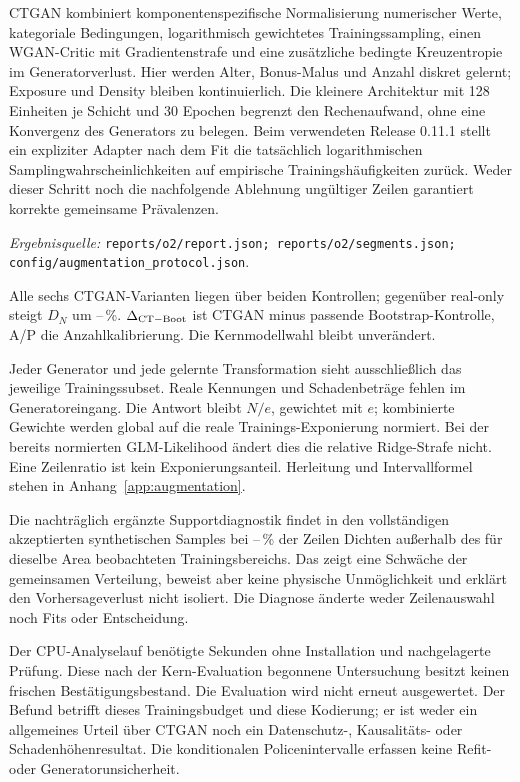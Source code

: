 \documentclass[11pt,a4paper]{article}
\newcommand{\evidence}[1]{\par{\footnotesize\textit{Ergebnisquelle:} \nolinkurl{#1}.}\par}
\begin{document}
CTGAN \cite{ctgan} kombiniert komponentenspezifische Normalisierung numerischer Werte, kategoriale Bedingungen, logarithmisch gewichtetes Trainingssampling, einen WGAN-Critic mit Gradientenstrafe und eine zusätzliche bedingte Kreuzentropie im Generatorverlust. Hier werden Alter, Bonus-Malus und Anzahl diskret gelernt; Exposure und Density bleiben kontinuierlich. Die kleinere Architektur mit 128 Einheiten je Schicht und 30 Epochen begrenzt den Rechenaufwand, ohne eine Konvergenz des Generators zu belegen. Beim verwendeten Release 0.11.1 stellt ein expliziter Adapter nach dem Fit die tatsächlich logarithmischen Samplingwahrscheinlichkeiten auf empirische Trainingshäufigkeiten zurück. Weder dieser Schritt noch die nachfolgende Ablehnung ungültiger Zeilen garantiert korrekte gemeinsame Prävalenzen.

\begin{center}\AugmentationTable\end{center}
\evidence{reports/o2/report.json; reports/o2/segments.json; config/augmentation_protocol.json}
Alle sechs CTGAN-Varianten liegen über beiden Kontrollen; gegenüber real-only steigt $D_N$ um \AugmentationMinLoss--\AugmentationMaxLoss\,\%. $\Delta_{\rm CT-Boot}$ ist CTGAN minus passende Bootstrap-Kontrolle, A/P die Anzahlkalibrierung. \AugmentationConclusion{} Die Kernmodellwahl bleibt unverändert.

Jeder Generator und jede gelernte Transformation sieht ausschließlich das jeweilige Trainingssubset. Reale Kennungen und Schadenbeträge fehlen im Generatoreingang. Die Antwort bleibt $N/e$, gewichtet mit $e$; kombinierte Gewichte werden global auf die reale Trainings-Exponierung normiert. Bei der bereits normierten GLM-Likelihood ändert dies die relative Ridge-Strafe nicht. Eine Zeilenratio ist kein Exponierungsanteil. Herleitung und Intervallformel stehen in Anhang~\ref{app:augmentation}.

Die nachträglich ergänzte Supportdiagnostik findet in den vollständigen akzeptierten synthetischen Samples bei \AugmentationSupportMin--\AugmentationSupportMax\,\% der Zeilen Dichten außerhalb des für dieselbe Area beobachteten Trainingsbereichs. Das zeigt eine Schwäche der gemeinsamen Verteilung, beweist aber keine physische Unmöglichkeit und erklärt den Vorhersageverlust nicht isoliert. Die Diagnose änderte weder Zeilenauswahl noch Fits oder Entscheidung.

Der CPU-Analyselauf benötigte \AugmentationSeconds{} Sekunden ohne Installation und nachgelagerte Prüfung. Diese nach der Kern-Evaluation begonnene Untersuchung besitzt keinen frischen Bestätigungsbestand. Die Evaluation wird nicht erneut ausgewertet. Der Befund betrifft dieses Trainingsbudget und diese Kodierung; er ist weder ein allgemeines Urteil über CTGAN noch ein Datenschutz-, Kausalitäts- oder Schadenhöhenresultat. Die konditionalen Policenintervalle erfassen keine Refit- oder Generatorunsicherheit.
\end{document}
